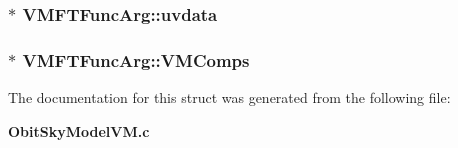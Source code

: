 \subsubsection{$\ast$ {\bf VMFTFunc\-Arg::uvdata}}\label{structVMFTFuncArg_o3}


\subsubsection{$\ast$ {\bf VMFTFunc\-Arg::VMComps}}\label{structVMFTFuncArg_o10}




The documentation for this struct was generated from the following file:\begin{CompactItemize}
\item 
{\bf Obit\-Sky\-Model\-VM.c}\end{CompactItemize}
